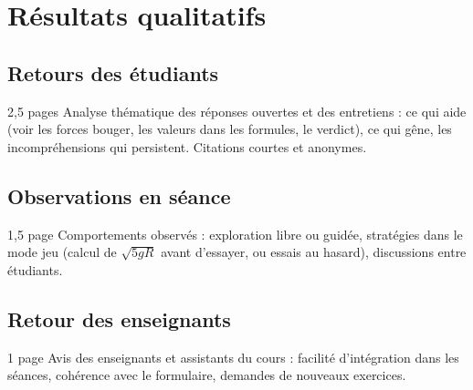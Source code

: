 
\chapter{Résultats qualitatifs}
\label{chap:resultats-qualitatifs}

\section{Retours des étudiants}

\begin{arediger}{2,5 pages}
Analyse thématique des réponses ouvertes et des entretiens : ce qui aide
(voir les forces bouger, les valeurs dans les formules, le verdict), ce qui
gêne, les incompréhensions qui persistent. Citations courtes et anonymes.
\end{arediger}

\section{Observations en séance}

\begin{arediger}{1,5 page}
Comportements observés : exploration libre ou guidée, stratégies dans le
mode jeu (calcul de \(\sqrt{5 g R}\) avant d'essayer, ou essais au hasard),
discussions entre étudiants.
\end{arediger}

\section{Retour des enseignants}

\begin{arediger}{1 page}
Avis des enseignants et assistants du cours : facilité d'intégration dans les
séances, cohérence avec le formulaire, demandes de nouveaux exercices.
\end{arediger}
